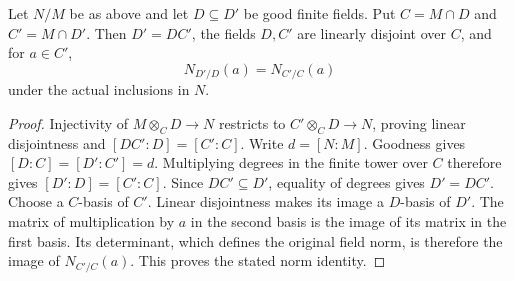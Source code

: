 \begin{lemma}
\label{fw:good-finite-pair-norm-basechange}
\leanok
Let $N/M$ be as above and let $D\subseteq D'$ be good finite fields.
Put $C=M\cap D$ and $C'=M\cap D'$. Then $D'=DC'$, the fields
$D,C'$ are linearly disjoint over $C$, and for $a\in C'$,
\[
 N_{D'/D}(a)=N_{C'/C}(a)
\]
under the actual inclusions in $N$.
\end{lemma}
\begin{proof}
Injectivity of $M\otimes_C D\to N$ restricts to
$C'\otimes_C D\to N$, proving linear disjointness and
$[DC':D]=[C':C]$. Write $d=[N:M]$.
Goodness gives $[D:C]=[D':C']=d$. Multiplying degrees in the
finite tower over $C$ therefore gives $[D':D]=[C':C]$.
Since $DC'\subseteq D'$, equality of degrees gives $D'=DC'$.
Choose a $C$-basis of $C'$. Linear disjointness makes its image a
$D$-basis of $D'$. The matrix of multiplication by $a$ in the second
basis is the image of its matrix in the first basis. Its determinant,
which defines the original field norm, is therefore the image of
$N_{C'/C}(a)$. This proves the stated norm identity.
\end{proof}

